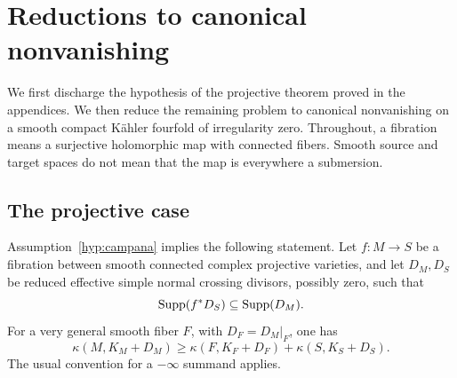 \section{Reductions to canonical nonvanishing}
\label{red:section}

We first discharge the hypothesis of the projective theorem proved in
the appendices. We then reduce the remaining problem to canonical
nonvanishing on a smooth compact Kähler fourfold of irregularity zero.
Throughout, a fibration means a surjective holomorphic map with connected
fibers. Smooth source and target spaces do not mean that the map is
everywhere a submersion.

\subsection{The projective case}

\begin{lemma}\label{red:log-iitaka}
Assumption~\ref{hyp:campana} implies the following statement. Let
\(f:M\to S\) be a fibration between smooth connected complex projective
varieties, and let \(D_M,D_S\) be reduced effective simple normal crossing
divisors, possibly zero, such that
\begin{equation}\label{red:boundary-compatibility}
 \operatorname{Supp}(f^*D_S)\subseteq\operatorname{Supp}(D_M).
\end{equation}
For a very general smooth fiber \(F\), with \(D_F=D_M|_F\), one has
\begin{equation}\label{red:log-iitaka-inequality}
 \kappa(M,K_M+D_M)
 \geq \kappa(F,K_F+D_F)+\kappa(S,K_S+D_S).
\end{equation}
The usual convention for a \(-\infty\) summand applies.
\end{lemma}

